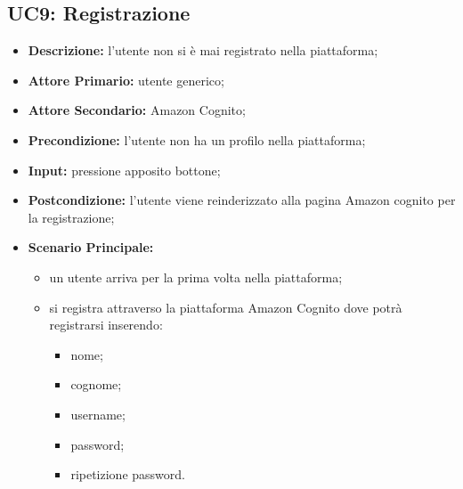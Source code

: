 \subsection{UC9: Registrazione}
\label{sec:UC9}
\begin{itemize}
    \item \textbf{Descrizione:} l'utente non si è mai registrato nella piattaforma;
    \item \textbf{Attore Primario:} utente generico;
    \item \textbf{Attore Secondario:} Amazon Cognito;
    \item \textbf{Precondizione:} l'utente non ha un profilo nella piattaforma;
    \item \textbf{Input:} pressione apposito bottone;
    \item \textbf{Postcondizione:} l'utente viene reinderizzato alla pagina Amazon cognito per la registrazione;
    \item \textbf{Scenario Principale:}
    \begin{itemize}
        \item un utente arriva per la prima volta nella piattaforma;
        \item si registra attraverso la piattaforma Amazon Cognito dove potrà registrarsi inserendo:
        \begin{itemize}
            \item nome;
            \item cognome;
            \item username;
            \item password;
            \item ripetizione password.
        \end{itemize}
    \end{itemize} 
\end{itemize}